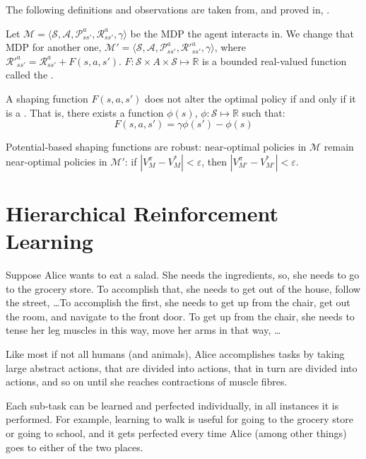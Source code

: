The following definitions and observations are taken from, and proved in,
\citet{ng1999policy}.

Let $\mathcal{M} = \langle \mathcal{S}, \mathcal{A},
\mathcal{P}^a_{ss'}, \mathcal{R}^a_{ss'}, \gamma \rangle$ be the \ac{MDP} the
agent interacts in. We change that \ac{MDP} for another one, $\mathcal{M}' = \langle
\mathcal{S}, \mathcal{A}, \mathcal{P}^a_{ss'}, \mathcal{R}'^a_{ss'}, \gamma
\rangle$, where $\mathcal{R}'^a_{ss'} = \mathcal{R}^a_{ss'} + F(s, a, s')$.
$F : \mathcal{S} \times A \times \mathcal{S} \mapsto \mathbb{R}$ is a bounded
real-valued function called the .

A shaping function $F(s, a, s')$ does not alter the optimal policy if and only
if it is a . That is, there exists a
function $\phi(s)$, $\phi : \mathcal{S} \mapsto \mathbb{R}$ such that:
\begin{equation}
  F(s, a, s') = \gamma \phi(s') - \phi(s)
  \label{eq:shaping-reward}
\end{equation}

Potential-based shaping functions are robust: near-optimal policies
in $\mathcal{M}$ remain near-optimal policies in $\mathcal{M'}$: if $\left|
V^\pi_M - V^*_M \right| < \varepsilon$, then $\left| V^\pi_{M'} - V^*_{M'}
\right| < \varepsilon$.

\section{Hierarchical Reinforcement Learning\label{sec:hierarchical-rl}}

Suppose Alice wants to eat a salad. She needs the ingredients, so, she needs to
go to the grocery store. To accomplish that, she needs to get out of the house,
follow the street, \dots To accomplish the first, she needs to get up from the
chair, get out the room, and navigate to the front door. To get up from the
chair, she needs to tense her leg muscles in this way, move her arms in that
way, \dots

Like most if not all humans (and animals), Alice accomplishes tasks by taking
large abstract actions, that are divided into actions, that in turn are divided
into actions, and so on until she reaches contractions of muscle fibres.

Each sub-task can be learned and perfected individually, in all instances it is
performed. For example, learning to walk is useful for going to the grocery
store or going to school, and it gets perfected every time Alice (among other
things) goes to either of the two places.

